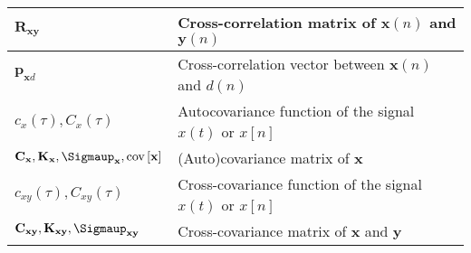 \documentclass{article}
\begin{document}
\begin{xltabular}{\textwidth}{XX}
	\(\mathbf{R}_\mathbf{xy}\)                                                                                                    & Cross-correlation matrix of \(\mathbf{x}(n)\) and \(\mathbf{y}(n)\)                                                                                                                                                                \\ \hline
	\(\mathbf{p}_{\mathbf{x}d}\)                                                                                                  & Cross-correlation vector between \(\mathbf{x}(n)\) and \(d(n)\) \cite{dinizAdaptiveFiltering1997}                                                                                                                                  \\ \hline
	\(c_x(\tau), C_x(\tau)\)                                                                                                      & Autocovariance function of the signal \(x(t)\) or \(x[n]\) \cite{nossekAdaptiveArraySignal2015}                                                                                                                                    \\ \hline
	\(\mathbf{C}_\mathbf{x}, \mathbf{K}_\mathbf{x}, \boldsymbol{\Sigmaup}_\mathbf{x}, \textnormal{cov}\left[ \mathbf{x} \right]\) & (Auto)covariance matrix of \(\mathbf{x}\) \cite{vantreesOptimumArrayProcessing2002,proakisDigitalCommunications2007,leon-garciaProbabilityStatisticsRandom2007,haykinAdaptiveFilterTheory2002,bishopPatternRecognitionMachine2006} \\ \hline
	\(c_{xy}(\tau), C_{xy}(\tau)\)                                                                                                & Cross-covariance function of the signal \(x(t)\) or \(x[n]\) \cite{nossekAdaptiveArraySignal2015}                                                                                                                                  \\ \hline
	\(\mathbf{C}_{\mathbf{xy}}, \mathbf{K}_{\mathbf{xy}}, \boldsymbol{\Sigmaup}_{\mathbf{xy}}\)                                   & Cross-covariance matrix of \(\mathbf{x}\) and \(\mathbf{y}\)
\end{xltabular}
\end{document}
